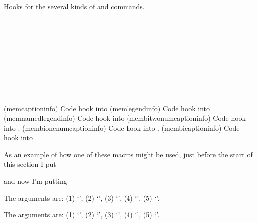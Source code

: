 Hooks for the several kinds of \cmd{\caption} and \cmd{\legend}
commands.
\begin{syntax}
\cmd{\memcaptioninfo} \\
\cmd{\memlegendinfo} \\
\cmd{\memnamedlegendinfo} \\
\cmd{\membitwonumcaptioninfo} \\
\hspace*{1.8in}  \\
\cmd{\membionenumcaptioninfo} \\ 
\hspace*{1.8in}  \\
\cmd{\membicaptioninfo} \\
\end{syntax}
\glossary(memcaptioninfo)%
  {}%
  {Code hook into }%
\glossary(memlegendinfo)%
  {}%
  {Code hook into }%
\glossary(memnamedlegendinfo)%
  {}%
  {Code hook into }%
\glossary(membitwonumcaptioninfo)%
  {   
      }%
  {Code hook into .}%
\glossary(membionenumcaptioninfo)%
  {  
      }%
  {Code hook into .}%
\glossary(membicaptioninfo)%
  {   
     }%
  {Code hook into .}%


    As an example of how one of these macros might be used, 
just before the start of this section I put
\begin{lcode}
\renewcommand{\memsecinfo}[5]{\edef\Margi{#1}\edef\Margii{#2}%
                              \edef\Margiii{#3}\edef\Margiv{#4}%
                              \edef\Margv{#5}}
\end{lcode}
and now I'm putting
\begin{lcode}
The arguments are: (1) `\Margi', (2) `\Margii', (3) `\Margiii', 
                   (4) `\Margiv', (5) `\Margv'.
\end{lcode}
The arguments are: (1) `\Margi', (2) `\Margii', (3) `\Margiii', 
                   (4) `\Margiv', (5) `\Margv'.

